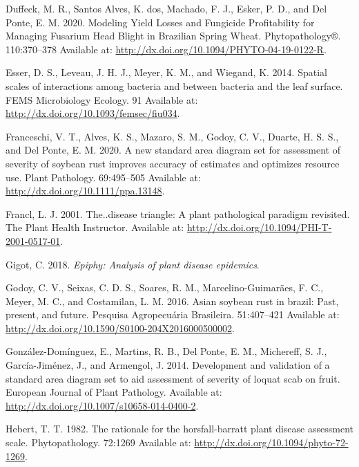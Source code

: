 \documentclass[
  letterpaper,
  DIV=11,
  numbers=noendperiod]{scrreprt}
\newlength{\cslhangindent}
\newlength{\cslentryspacingunit} %
\newenvironment{CSLReferences}[2] %
 {%
  \setlength{\parindent}{0pt}
  \ifodd #1
  \let\oldpar\par
  \def\par{\hangindent=\cslhangindent\oldpar}
  \fi
  \setlength{\parskip}{#2\cslentryspacingunit}
 }%
 {}
\begin{document}
\begin{CSLReferences}{0}{0}
\leavevmode{}%
Duffeck, M. R., Santos Alves, K. dos, Machado, F. J., Esker, P. D., and
Del Ponte, E. M. 2020. Modeling Yield Losses and Fungicide Profitability
for Managing Fusarium Head Blight in Brazilian Spring Wheat.
Phytopathology®. 110:370--378 Available at:
\url{http://dx.doi.org/10.1094/PHYTO-04-19-0122-R}.

\leavevmode{}%
Esser, D. S., Leveau, J. H. J., Meyer, K. M., and Wiegand, K. 2014.
Spatial scales of interactions among bacteria and between bacteria and
the leaf surface. FEMS Microbiology Ecology. 91 Available at:
\url{http://dx.doi.org/10.1093/femsec/fiu034}.

\leavevmode{}%
Franceschi, V. T., Alves, K. S., Mazaro, S. M., Godoy, C. V., Duarte, H.
S. S., and Del Ponte, E. M. 2020. A new standard area diagram set for
assessment of severity of soybean rust improves accuracy of estimates
and optimizes resource use. Plant Pathology. 69:495--505 Available at:
\url{http://dx.doi.org/10.1111/ppa.13148}.

\leavevmode{}%
Francl, L. J. 2001. The..disease triangle: A plant pathological paradigm
revisited. The Plant Health Instructor. Available at:
\url{http://dx.doi.org/10.1094/PHI-T-2001-0517-01}.

\leavevmode{}%
Gigot, C. 2018. \emph{Epiphy: Analysis of plant disease epidemics}.

\leavevmode{}%
Godoy, C. V., Seixas, C. D. S., Soares, R. M., Marcelino-Guimarães, F.
C., Meyer, M. C., and Costamilan, L. M. 2016. Asian soybean rust in
brazil: Past, present, and future. Pesquisa Agropecuária Brasileira.
51:407--421 Available at:
\url{http://dx.doi.org/10.1590/S0100-204X2016000500002}.

\leavevmode{}%
González-Domínguez, E., Martins, R. B., Del Ponte, E. M., Michereff, S.
J., García-Jiménez, J., and Armengol, J. 2014. Development and
validation of a standard area diagram set to aid assessment of severity
of loquat scab on fruit. European Journal of Plant Pathology. Available
at: \url{http://dx.doi.org/10.1007/s10658-014-0400-2}.

\leavevmode{}%
Hebert, T. T. 1982. The rationale for the horsfall-barratt plant disease
assessment scale. Phytopathology. 72:1269 Available at:
\url{http://dx.doi.org/10.1094/phyto-72-1269}.


\end{CSLReferences}
\end{document}
